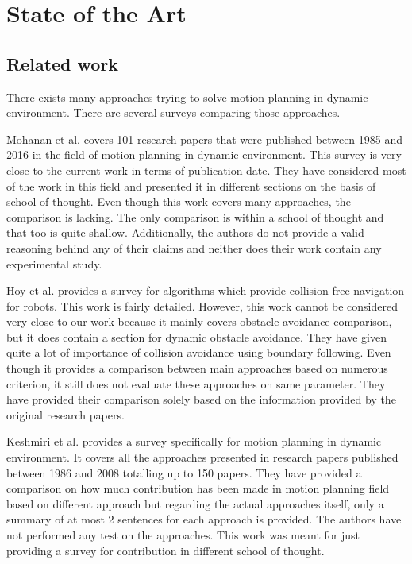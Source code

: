
\chapter{State of the Art}

\section{Related work}%
\label{sec:related_work}

There exists many approaches trying to solve motion planning in dynamic environment. There are 
several surveys comparing those approaches.

Mohanan et al.\cite{mohanan2018a} covers 101 research papers that were published between 1985 and 
2016 in the field of motion planning in dynamic environment. This survey is very close to the 
current work in terms of publication date. They have considered most of the work in this field and 
presented it in different sections on the basis of school of thought. Even though this work covers 
many approaches, the comparison is lacking. The only comparison is within a school of thought and 
that too is quite shallow. Additionally, the authors do not provide a valid reasoning behind any 
of their claims and neither does their work contain any experimental study. 

Hoy et al.\cite{hoy2015algorithms} provides a survey for algorithms which provide collision free 
navigation for robots. This work is fairly detailed. However, this work cannot be considered very close to 
our work because it mainly covers obstacle avoidance comparison, but it does contain a section for 
dynamic obstacle avoidance. They have given quite a lot of importance of collision avoidance using 
boundary following. Even though it provides a comparison between main approaches based on numerous 
criterion, it still does not evaluate these approaches on same parameter. They have provided their 
comparison solely based on the information provided by the original research papers.

Keshmiri et al.\cite{keshmiri2009overview} provides a survey specifically for motion planning 
in dynamic environment. It covers all the approaches presented in research papers published between 
1986 and 2008 totalling up to 150 papers. They have provided a comparison on how much contribution 
has been made in motion planning field based on different approach but regarding the actual 
approaches itself, only a summary of at most 2 sentences for each approach is provided. The authors
have not performed any test on the approaches. This work was meant for just providing a survey 
for contribution in different school of thought.


